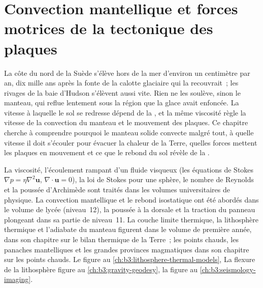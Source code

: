 \chapter{Convection mantellique et forces motrices de la tectonique des plaques}\label{ch:b3:mantle-convection}

La côte du nord de la Suède s'élève hors de la mer d'environ un centimètre par
an, dix mille ans après la fonte de la calotte glaciaire qui la recouvrait~; les
rivages de la baie d'Hudson s'élèvent aussi vite. Rien ne les soulève, sinon le manteau,
qui reflue lentement sous la région que la glace avait enfoncée. La vitesse
à laquelle le sol se redresse dépend de la , et la même
viscosité règle la vitesse de la convection du manteau et le mouvement des plaques. Ce chapitre
cherche à comprendre pourquoi le manteau solide convecte malgré tout, à quelle vitesse il doit s'écouler
pour évacuer la chaleur de la Terre, quelles forces mettent les plaques en mouvement et ce que le rebond du sol
révèle de la .

\begin{recall}
La viscosité, l'écoulement rampant d'un fluide visqueux (les équations de Stokes
$\nabla p = \eta\nabla^2\mathbf u$, $\nabla\cdot\mathbf u = 0$), la loi de Stokes
pour une sphère, le nombre de Reynolds et la poussée d'Archimède sont traités dans les
volumes universitaires de physique. La convection mantellique et le rebond isostatique ont été abordés dans le
volume de lycée (niveau~12), la poussée à la dorsale et la traction du panneau plongeant dans sa partie de niveau~11.
La couche limite thermique, la lithosphère thermique et l'adiabate du manteau figurent
dans le volume de première année, dans son chapitre sur le bilan thermique de la Terre~; les points chauds,
les panaches mantelliques et les grandes provinces magmatiques dans son chapitre sur les points chauds.
Le  figure au \cref{ch:b3:lithosphere-thermal-models},
La flexure de la lithosphère figure au \cref{ch:b3:gravity-geodesy}, la
 figure au \cref{ch:b3:seismology-imaging}.
\end{recall}


